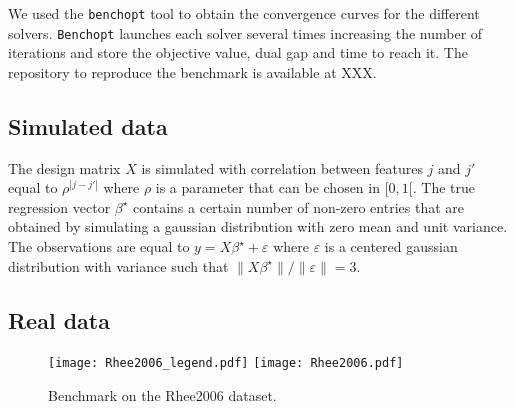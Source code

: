 We used the \texttt{benchopt} \cite{moreau2022benchopt} tool to obtain the convergence curves for the different solvers.
\texttt{Benchopt} launches each solver several times increasing the number of iterations and store the objective value, dual gap and time to reach it.
The repository to reproduce the benchmark is available at XXX.

\subsection{Simulated data}
The design matrix $X$ is simulated with correlation between features $j$ and $j'$ equal to $\rho^{|j-j'|}$ where $\rho$ is a parameter that can be chosen in $[0, 1[$. 
The true regression vector $\beta^\star$ contains a certain number of non-zero entries that are obtained by simulating a gaussian distribution with zero mean and unit variance.
The observations are equal to $y=X\beta^\star + \varepsilon$ where $\varepsilon$ is a centered gaussian distribution with variance such that $\lVert X\beta^\star\rVert / \lVert \varepsilon \rVert = 3$.

\subsection{Real data}
\begin{figure}[htbp]
    \centering
    \texttt{[image: Rhee2006\_legend.pdf]}
    \texttt{[image: Rhee2006.pdf]}
    \caption{Benchmark on the Rhee2006 dataset.}
    \label{fig:Rhee2006}
  \end{figure}